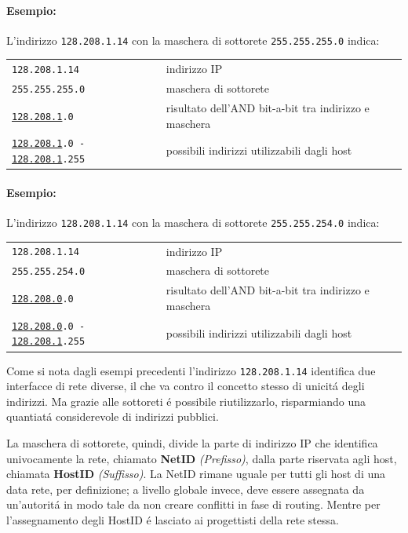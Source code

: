 \documentclass[12pt]{article}
\def\code#1{\texttt{#1}}
\begin{document}
\paragraph{Esempio:} L'indirizzo \code{128.208.1.14} con la maschera di sottorete \code{255.255.255.0} indica:
\begin{center}
	\begin{tabular}{l|l}
		\code{128.208.1.14}                  & indirizzo IP \\
		\code{255.255.255.0}                 & maschera di sottorete \\
		\code{\underline{128.208.1}.0}       & risultato dell'AND bit-a-bit tra indirizzo e maschera\\
		\code{\underline{128.208.1}.0 - \underline{128.208.1}.255}   & possibili indirizzi utilizzabili dagli host \\
	\end{tabular}
\end{center}

\paragraph{Esempio:} L'indirizzo \code{128.208.1.14} con la maschera di sottorete \code{255.255.254.0} indica:
\begin{center}
	\begin{tabular}{l|l}
		\code{128.208.1.14}                  & indirizzo IP \\
		\code{255.255.254.0}                 & maschera di sottorete \\
		\code{\underline{128.208.0}.0}       & risultato dell'AND bit-a-bit tra indirizzo e maschera\\
		\code{\underline{128.208.0}.0 - \underline{128.208.1}.255}   & possibili indirizzi utilizzabili dagli host \\
	\end{tabular}
\end{center}

Come si nota dagli esempi precedenti l'indirizzo \code{128.208.1.14} identifica due interfacce di rete diverse, il che 
va contro il concetto stesso di unicit\'a degli indirizzi. Ma grazie alle sottoreti \'e possibile riutilizzarlo, 
risparmiando una quantiat\'a considerevole di indirizzi pubblici.

La maschera di sottorete, quindi, divide la parte di indirizzo IP che identifica univocamente la rete, chiamato 
\textbf{NetID} \textit{(Prefisso)}, dalla parte riservata agli host, chiamata \textbf{HostID} \textit{(Suffisso)}. La 
NetID rimane uguale per tutti gli host di una data rete, per definizione; a livello globale invece, deve essere 
assegnata da un'autorit\'a in modo tale da non creare conflitti in fase di routing. Mentre per l'assegnamento degli 
HostID \'e lasciato ai progettisti della rete stessa.
\end{document}
